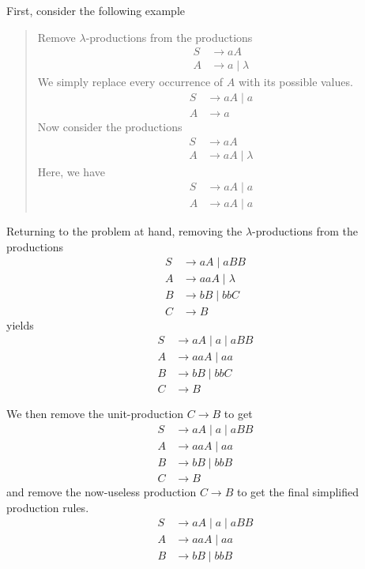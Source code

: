 \documentclass{article}
\begin{document}
First, consider the following example
\begin{quote}
    Remove $\lambda$-productions from the productions
    \begin{align*}
        S & \to aA             \\
        A & \to a \mid \lambda
    \end{align*}
    We simply replace every occurrence of $A$ with its possible values.
    \begin{align*}
        S & \to aA \mid a \\
        A & \to a
    \end{align*}
    Now consider the productions
    \begin{align*}
        S & \to aA              \\
        A & \to aA \mid \lambda
    \end{align*}
    Here, we have
    \begin{align*}
        S & \to aA \mid a \\
        A & \to aA \mid a
    \end{align*}
\end{quote}
Returning to the problem at hand, removing the $\lambda$-productions from the productions
\begin{align*}
    S & \to aA \mid aBB      \\
    A & \to aaA \mid \lambda \\
    B & \to bB \mid bbC      \\
    C & \to B
\end{align*}
yields
\begin{align*}
    S & \to aA \mid a \mid aBB \\
    A & \to aaA \mid aa        \\
    B & \to bB \mid bbC        \\
    C & \to B
\end{align*}

We then remove the unit-production $C \to B$ to get
\begin{align*}
    S & \to aA \mid a \mid aBB \\
    A & \to aaA \mid aa        \\
    B & \to bB \mid bbB        \\
    C & \to B
\end{align*}
and remove the now-useless production $C \to B$ to get the final simplified production rules.
\begin{align*}
    S & \to aA \mid a \mid aBB \\
    A & \to aaA \mid aa        \\
    B & \to bB \mid bbB
\end{align*}
\end{document}
